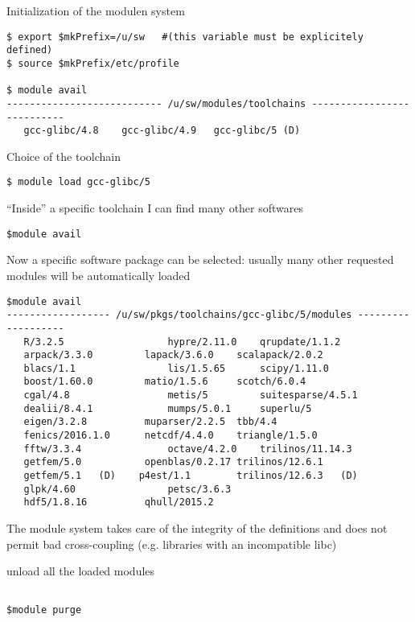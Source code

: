 \documentclass[9pt]{beamer}
\begin{document}
\begin{frame}[fragile]

Initialization of the modulen  system

\begin{verbatim}
$ export $mkPrefix=/u/sw   #(this variable must be explicitely defined)
$ source $mkPrefix/etc/profile

$ module avail
--------------------------- /u/sw/modules/toolchains ---------------------------
   gcc-glibc/4.8	gcc-glibc/4.9	gcc-glibc/5 (D)
\end{verbatim}

Choice of the toolchain
\begin{verbatim}
$ module load gcc-glibc/5
\end{verbatim}

“Inside” a specific toolchain I can find many other softwares
\begin{verbatim}
$module avail
\end{verbatim}
\end{frame}


\begin{frame}[fragile]
Now a specific software package can be selected: usually many other requested modules will be automatically loaded
\begin{verbatim}
$module avail
------------------ /u/sw/pkgs/toolchains/gcc-glibc/5/modules -------------------
   R/3.2.5            		hypre/2.11.0   	qrupdate/1.1.2
   arpack/3.3.0       	lapack/3.6.0   	scalapack/2.0.2
   blacs/1.1          		lis/1.5.65     	scipy/1.11.0
   boost/1.60.0       	matio/1.5.6    	scotch/6.0.4
   cgal/4.8           		metis/5        	suitesparse/4.5.1
   dealii/8.4.1       		mumps/5.0.1    	superlu/5
   eigen/3.2.8        	muparser/2.2.5 	tbb/4.4
   fenics/2016.1.0    	netcdf/4.4.0   	triangle/1.5.0
   fftw/3.3.4         		octave/4.2.0   	trilinos/11.14.3
   getfem/5.0         	openblas/0.2.17	trilinos/12.6.1
   getfem/5.1  	(D)	   p4est/1.1      	trilinos/12.6.3   (D)
   glpk/4.60          		petsc/3.6.3
   hdf5/1.8.16        	qhull/2015.2
   \end{verbatim}

The module system takes care of the integrity of the definitions and does not permit bad cross-coupling (e.g. libraries with an incompatible libc)

unload all the loaded modules
\begin{verbatim}

$module purge
\end{verbatim}
\end{frame}
\end{document}
